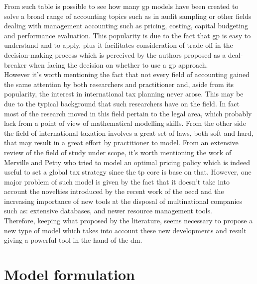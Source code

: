 \begin{doublespace}
From such table is possible to see how many \gls{gp} models have been created to solve a broad range of accounting topics such as in audit sampling or other fields dealing with management accounting such as pricing, costing, capital budgeting and performance evaluation.
This popularity is due to the fact that \gls{gp} is easy to understand and to apply, plus it facilitates consideration of trade-off in the decision-making process which is perceived by the authors proposed as a deal-breaker when facing the decision on whether to use a \gls{gp} approach.
\\
However it's worth mentioning the fact that not every field of accounting gained the same attention by both researchers and practitioner and, aside from its popularity, the interest in international tax planning never arose. This may be due to the typical background that such researchers have on the field. In fact most of the research moved in this field pertain to the legal area, which probably lack from a point of view of mathematical modelling skills. From the other side the field of international taxation involves a great set of laws, both soft and hard, that may result in a great effort by practitioner to model. 
From an extensive review of the field of study under scope, it's worth mentioning the work of Merville and Petty\cite{Merville1978} who tried to model an optimal pricing policy which is indeed useful to set a global tax strategy since the \gls{tp} core is base on that. However, one major problem of such model is given by the fact that it doesn't take into account the novelties introduced by the recent work of the \gls{oecd} and the increasing importance of new tools at the disposal of multinational companies such as: extensive databases, and newer resource management tools.
\\
Therefore, keeping what proposed by the literature, seems necessary to propose a new type of model which takes into account these new developments and result giving a powerful tool in the hand of the \gls{dm}.

\pagebreak

\section{Model formulation}


\end{doublespace}
